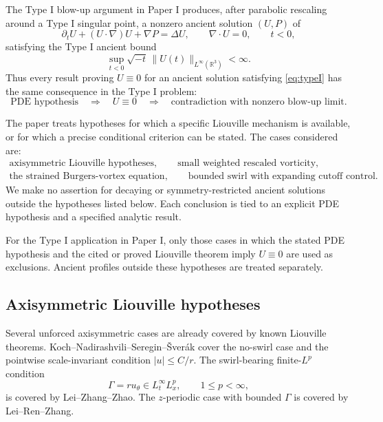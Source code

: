 \documentclass[11pt]{amsart}
\theoremstyle{plain}
\theoremstyle{definition}
\theoremstyle{remark}
\numberwithin{equation}{section}
\begin{document}
The Type I blow-up argument in Paper I \cite{DuranPaperI} produces, after
parabolic rescaling around a Type I singular point, a nonzero ancient solution
\((U,P)\) of
\begin{equation}\label{eq:NS}
   \partial_tU+(U\cdot\nabla)U+\nabla P=\Delta U,
   \qquad \nabla\cdot U=0,
   \qquad t<0,
\end{equation}
satisfying the Type I ancient bound
\begin{equation}\label{eq:typeI}
   \sup_{t<0}\sqrt{-t}\,
   \|U(t)\|_{L^\infty(\mathbb R^3)}<\infty .
\end{equation}
Thus every result proving \(U\equiv0\) for an ancient solution satisfying
\eqref{eq:typeI} has the same consequence in the Type I problem:
\[
   \text{PDE hypothesis}
   \quad\Longrightarrow\quad
   U\equiv0
   \quad\Longrightarrow\quad
   \text{contradiction with nonzero blow-up limit}.
\]

The paper treats hypotheses for which a specific Liouville mechanism is
available, or for which a precise conditional criterion can be stated.  The
cases considered are:
\[
   \begin{gathered}
   \text{axisymmetric Liouville hypotheses},\qquad
   \text{small weighted rescaled vorticity},\\
   \text{the strained Burgers-vortex equation},\qquad
   \text{bounded swirl with expanding cutoff control}.
   \end{gathered}
\]
We make no assertion for decaying or symmetry-restricted ancient solutions
outside the hypotheses listed below.  Each conclusion is tied to an explicit
PDE hypothesis and a specified analytic result.

For the Type I application in Paper I, only those cases in which the stated
PDE hypothesis and the cited or proved Liouville theorem imply \(U\equiv0\)
are used as exclusions.  Ancient profiles outside these hypotheses are treated
separately.

\subsection{Axisymmetric Liouville hypotheses}

Several unforced axisymmetric cases are already covered by known Liouville
theorems.  Koch--Nadirashvili--Seregin--\v{S}ver\'ak cover the no-swirl case
and the pointwise scale-invariant condition \(|u|\le C/r\).  The
swirl-bearing finite-\(L^p\) condition
\[
   \Gamma=ru_\theta\in L_t^\infty L_x^p,\qquad 1\le p<\infty,
\]
is covered by Lei--Zhang--Zhao.  The \(z\)-periodic case with bounded
\(\Gamma\) is covered by Lei--Ren--Zhang.
\end{document}

